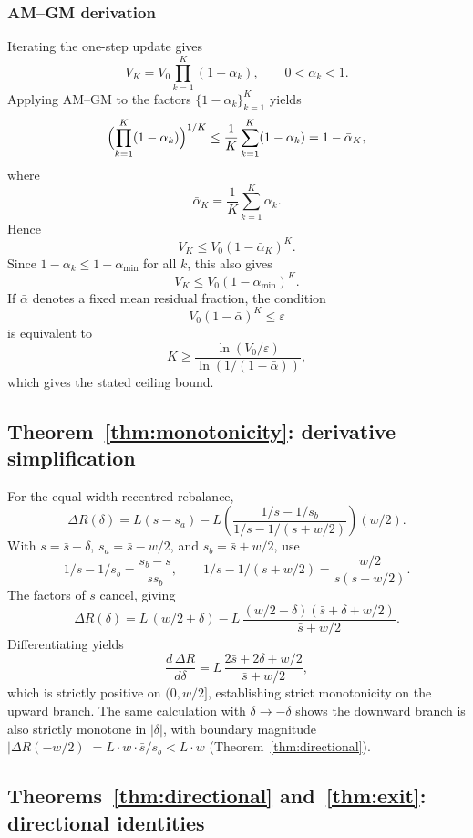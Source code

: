\documentclass{manuscript}
\begin{document}
\subsubsection*{AM--GM derivation}

Iterating the one-step update gives
\[
V_K = V_0 \prod_{k=1}^{K} (1 - \alpha_k),
\qquad 0 < \alpha_k < 1.
\]
Applying AM--GM to the factors $\{1-\alpha_k\}_{k=1}^K$ yields
\[
\Bigl(\prod_{k=1}^K (1 - \alpha_k)\Bigr)^{1/K}
\leq
\frac{1}{K}\sum_{k=1}^K (1 - \alpha_k)
=
1 - \bar\alpha_K,
\]
where
\[
\bar\alpha_K = \frac{1}{K}\sum_{k=1}^K \alpha_k.
\]
Hence
\[
V_K \leq V_0(1 - \bar\alpha_K)^K.
\]
Since $1 - \alpha_k \leq 1 - \alpha_{\min}$ for all $k$, this also gives
\[
V_K \leq V_0(1 - \alpha_{\min})^K.
\]
If $\bar\alpha$ denotes a fixed mean residual fraction, the condition
\[
V_0(1 - \bar\alpha)^K \leq \varepsilon
\]
is equivalent to
\[
K \geq \frac{\ln(V_0/\varepsilon)}{\ln(1/(1-\bar\alpha))},
\]
which gives the stated ceiling bound.

\subsection{Theorem~\ref{thm:monotonicity}: derivative simplification}

For the equal-width recentred rebalance,
\begin{equation}\label{eq:dr-closed-form-app}
\Delta R(\delta) = L(s - s_a) - L\!\left(\frac{1/s - 1/s_b}{1/s - 1/(s + w/2)}\right)(w/2).
\end{equation}
With $s = \bar s + \delta$, $s_a = \bar s - w/2$, and $s_b = \bar s + w/2$, use
\[
1/s - 1/s_b = \frac{s_b - s}{s s_b},
\qquad
1/s - 1/(s + w/2) = \frac{w/2}{s(s + w/2)}.
\]
The factors of $s$ cancel, giving
\begin{equation}\label{eq:g-simplified}
\Delta R(\delta)
=
L\,(w/2 + \delta)
-
L\,\frac{(w/2 - \delta)(\bar s + \delta + w/2)}{\bar s + w/2}.
\end{equation}
Differentiating yields
\[
\frac{d\,\Delta R}{d\delta}
=
L\,\frac{2\bar s + 2\delta + w/2}{\bar s + w/2},
\]
which is strictly positive on \((0,w/2]\), establishing strict monotonicity on the upward branch. The same calculation with $\delta \to -\delta$ shows the downward branch is also strictly monotone in $|\delta|$, with boundary magnitude $|\Delta R(-w/2)| = L \cdot w \cdot \bar{s}/s_b < L \cdot w$ (Theorem~\ref{thm:directional}).

\subsection{Theorems~\ref{thm:directional} and~\ref{thm:exit}: directional identities}
\end{document}
